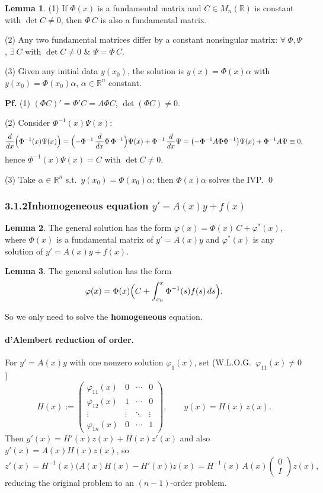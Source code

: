 \documentclass[11pt]{article}
\theoremstyle{definition}
\newtheorem*{lemma}{Lemma}
\theoremstyle{remark}
\newcommand{\R}{\mathbb{R}}
\newcommand{\subsecn}[1]{\subsubsection*{#1}}
\begin{document}
\begin{lemma}
(1) If $\Phi(x)$ is a fundamental matrix and $C \in M_n(\R)$ is constant with $\det C \neq 0$, then
$\Phi\, C$ is also a fundamental matrix.

(2) Any two fundamental matrices differ by a constant nonsingular matrix: $\forall\ \Phi, \Psi$,
$\exists\ C$ with $\det C \neq 0$ \& $\Psi = \Phi\, C$.

(3) Given any initial data $y(x_0)$, the solution is $y(x) = \Phi(x)\alpha$ with
$y(x_0) = \Phi(x_0)\alpha$, $\alpha \in \R^n$ constant.

\textbf{Pf.} (1) $(\Phi C)' = \Phi' C = A\Phi C$, $\det(\Phi C) \neq 0$.

(2) Consider $\Phi^{-1}(x)\Psi(x)$:
\[
\frac{d}{dx}\Bigl(\Phi^{-1}(x)\Psi(x)\Bigr)
= \Bigl(-\Phi^{-1}\,\frac{d}{dx}\Phi\,\Phi^{-1}\Bigr)\Psi(x) + \Phi^{-1}\,\frac{d}{dx}\Psi
= \bigl(-\Phi^{-1} A\Phi \Phi^{-1}\bigr)\Psi(x) + \Phi^{-1} A\Psi \equiv 0,
\]
hence $\Phi^{-1}(x)\Psi(x) = C$ with $\det C \neq 0$.

(3) Take $\alpha \in \R^n$ s.t.\ $y(x_0) = \Phi(x_0)\alpha$; then $\Phi(x)\alpha$ solves the IVP. \qed
\end{lemma}

\subsecn{3.1.2\quad Inhomogeneous equation $y' = A(x)y + f(x)$}

\begin{lemma}
The general solution has the form
$\varphi(x) = \Phi(x)\, C + \varphi^*(x)$,
where $\Phi(x)$ is a fundamental matrix of $y' = A(x)y$ and $\varphi^*(x)$ is any solution of
$y' = A(x)y + f(x)$.
\end{lemma}

\begin{lemma}
The general solution has the form
\[
\varphi(x) = \Phi(x)\Bigl(C + \int_{x_0}^x \Phi^{-1}(s) f(s)\, ds\Bigr).
\]
\end{lemma}

So we only need to solve the \textbf{homogeneous} equation.

\paragraph{d'Alembert reduction of order.}
For $y' = A(x)y$ with one nonzero solution $\varphi_1(x)$, set (W.L.O.G.\ $\varphi_{11}(x) \neq 0$)
\[
H(x) := \begin{pmatrix} \varphi_{11}(x) & 0 & \cdots & 0 \\ \varphi_{12}(x) & 1 & \cdots & 0 \\ \vdots & \vdots & \ddots & \vdots \\ \varphi_{1n}(x) & 0 & \cdots & 1 \end{pmatrix},
\qquad y(x) = H(x)\,z(x).
\]
Then $y'(x) = H'(x)z(x) + H(x)z'(x)$ and also $y'(x) = A(x)H(x)z(x)$, so
\[
z'(x) = H^{-1}(x)\bigl(A(x)H(x) - H'(x)\bigr)z(x) = H^{-1}(x)\,A(x)\begin{pmatrix} 0 \\ I \end{pmatrix}z(x),
\]
reducing the original problem to an $(n-1)$-order problem.
\end{document}
